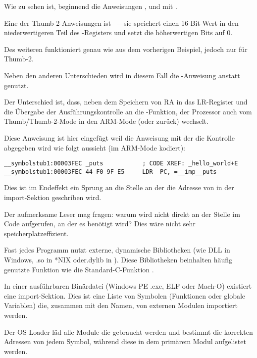 
Wie zu sehen ist, beginnend die Anweisungen ,  und  mit .

Eine der Thumb-2-Anweisungen ist  ~---sie speichert einen 16-Bit-Wert in den
niederwertigeren Teil des -Registers und setzt die höherwertigen Bits auf 0.

Des weiteren funktioniert  genau wie  aus dem vorherigen Beispiel,
jedoch nur für Thumb-2.


Neben den anderen Unterschieden wird in diesem Fall die -Anweisung anstatt  genutzt.

Der Unterschied ist, dass, neben dem Speichern von \ac{RA} in das \ac{LR}-Register und die Übergabe
der Ausführungskontrolle an die \puts-Funktion, der Prozessor auch vom Thumb/Thumb-2-Mode in den
ARM-Mode (oder zurück) wechselt.

Diese Anweisung ist hier eingefügt weil die Anweisung mit der die Kontrolle abgegeben wird wie folgt
aussieht (im ARM-Mode kodiert):

\begin{lstlisting}
__symbolstub1:00003FEC _puts           ; CODE XREF: _hello_world+E
__symbolstub1:00003FEC 44 F0 9F E5     LDR  PC, =__imp__puts
\end{lstlisting}

Dies ist im Endeffekt ein Sprung an die Stelle an der die Adresse von \puts in der import-Sektion geschriben wird.

Der aufmerksame Leser mag fragen: warum wird \puts nicht direkt an der Stelle im Code aufgerufen,
an der es benötigt wird? Dies wäre nicht sehr speicherplatzeffizient.

Fast jedes Programm nutzt externe, dynamische Bibliotheken (wie DLL in Windows, .so in *NIX oder.dylib in \MacOSX).
Diese Bibliotheken beinhalten häufig genutzte Funktion wie die Standard-C-Funktion \puts.

In einer ausführbaren Binärdatei (Windows PE .exe, ELF oder Mach-O) existiert eine import-Sektion.
Dies ist eine Liste von Symbolen (Funktionen oder globale Variablen) die, zusammen mit den Namen, von
externen Modulen importiert werden.

Der \ac{OS}-Loader läd alle Module die gebraucht werden und bestimmt die korrekten Adressen von jedem Symbol,
während diese in dem primärem Modul aufgelistet werden.

